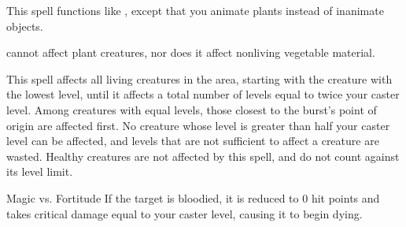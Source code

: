 \begin{spellheader}
\end{spellheader}
\begin{spellcontent}
    \begin{spelltargetinginfo}
    \end{spelltargetinginfo}
    \begin{spelleffects}
        \spelleffect This spell functions like , except that you animate plants instead of inanimate objects.
    \end{spelleffects}
\end{spellcontent}
\begin{spellfooter}
    \spellnotes {} cannot affect plant creatures, nor does it affect nonliving vegetable material.
\end{spellfooter}


\begin{spellheader}
\end{spellheader}
\begin{spellcontent}
    \begin{spelltargetinginfo}
    \end{spelltargetinginfo}
    \begin{spelleffects}
        \spelleffect This spell affects all \bloodied living creatures in the area, starting with the creature with the lowest level, until it affects a total number of levels equal to twice your caster level. Among creatures with equal levels, those closest to the burst's point of origin are affected first. No creature whose level is greater than half your caster level can be affected, and levels that are not sufficient to affect a creature are wasted. Healthy creatures are not affected by this spell, and do not count against its level limit.
        \begin{spellattack}{Magic vs. Fortitude}
            \spellsuccess If the target is bloodied, it is reduced to 0 hit points and takes critical damage equal to your caster level, causing it to begin dying.
        \end{spellattack}
    \end{spelleffects}
\end{spellcontent}
\begin{spellfooter}
\end{spellfooter}

